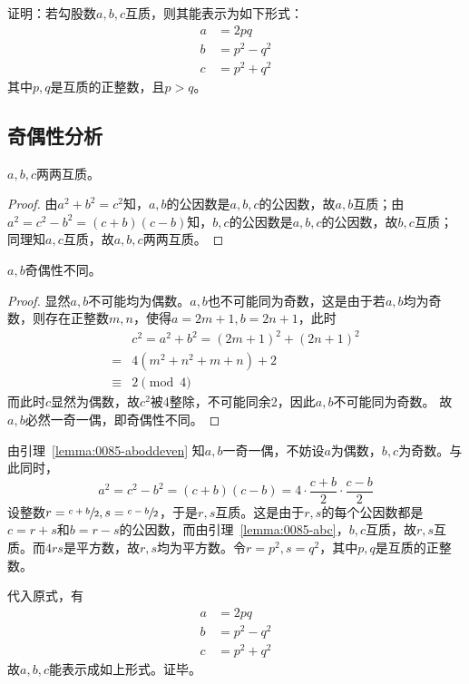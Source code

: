 

证明：若勾股数$a, b, c$互质，则其能表示为如下形式：
\begin{align*}
  a &= 2pq \\
  b &= p^2 - q^2 \\
  c &= p^2 + q^2
\end{align*}
其中$p, q$是互质的正整数，且$p > q$。

\subsection{奇偶性分析}

\begin{lemma} \label{lemma:0085-abc}
  $a, b, c$两两互质。
\end{lemma}

\begin{proof}
  由$a^2 + b^2 = c^2$知，$a, b$的公因数是$a, b, c$的公因数，故$a, b$互质；由$a^2 = c^2 - b^2 = (c + b)(c - b)$知，$b, c$的公因数是$a, b, c$的公因数，故$b, c$互质；同理知$a, c$互质，故$a, b, c$两两互质。
\end{proof}

\begin{lemma} \label{lemma:0085-aboddeven}
  $a, b$奇偶性不同。
\end{lemma}

\begin{proof}
  显然$a, b$不可能均为偶数。$a, b$也不可能同为奇数，这是由于若$a, b$均为奇数，则存在正整数$m, n$，使得$a = 2m + 1, b = 2n + 1$，此时
  \begin{align*}
    & c^2 = a^2 + b^2 = (2m + 1)^2 + (2n + 1)^2 \\
    ={}& 4\left(m^2 + n^2 + m + n\right) + 2 \\
    \equiv{}& 2 \pmod 4
  \end{align*}
  而此时$c$显然为偶数，故$c^2$被4整除，不可能同余2，因此$a, b$不可能同为奇数。
  故$a, b$必然一奇一偶，即奇偶性不同。
\end{proof}

由引理~\ref{lemma:0085-aboddeven} 知$a, b$一奇一偶，不妨设$a$为偶数，$b, c$为奇数。与此同时，
\[ a^2 = c^2 - b^2 = (c + b)(c - b) = 4\cdot\frac{c + b}2\cdot\frac{c - b}2 \]
设整数$r = \sfrac{c + b}2, s = \sfrac{c - b}2$，于是$r, s$互质。这是由于$r, s$的每个公因数都是$c = r + s$和$b = r - s$的公因数，而由引理~\ref{lemma:0085-abc}，$b, c$互质，故$r, s$互质。而$4rs$是平方数，故$r, s$均为平方数。令$r = p^2, s = q^2$，其中$p, q$是互质的正整数。

代入原式，有
\begin{align*}
  a &= 2pq \\
  b &= p^2 - q^2 \\
  c &= p^2 + q^2
\end{align*}
故$a, b, c$能表示成如上形式。证毕。
